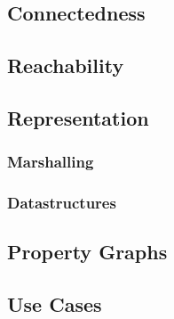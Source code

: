 \subsection{Connectedness}

\subsection{Reachability}

\subsection{Representation}
\subsubsection{Marshalling}
\subsubsection{Datastructures}

\subsection{Property Graphs}

\subsection{Use Cases}

\begin{itemize}
\end{itemize}

